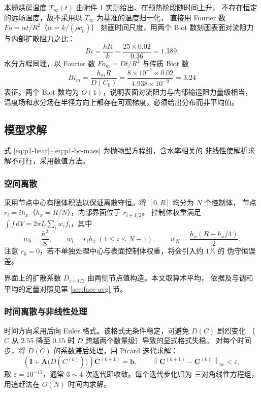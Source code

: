 \documentclass[12pt,a4paper,fontset=none]{ctexart}
\begin{document}
本题烘房温度 $T_\infty(t)$ 由附件 1 实测给出、在预热阶段随时间上升，
不存在恒定的远场温度，故不采用以 $T_\infty$ 为基准的温度归一化，
直接用 Fourier 数 $Fo=\alpha t/R^2$（$\alpha=k/(\rho c_p)$）
刻画时间尺度，用两个 Biot 数刻画表面对流阻力与内部扩散阻力之比：
\begin{equation}
  Bi=\frac{hR}{k}=\frac{25\times0.02}{0.36}=1.389 .
\end{equation}
水分方程同理，以 Fourier 数 $Fo_m=Dt/R^2$ 与传质 Biot 数
\begin{equation}
  Bi_m=\frac{h_mR}{D(C_0)}=\frac{8\times10^{-7}\times0.02}{4.938\times10^{-9}}
  =3.24
\end{equation}
表征。两个 Biot 数均为 $O(1)$，说明表面对流阻力与内部输运阻力量级相当，
温度场和水分场在半径方向上都存在可观梯度，必须给出分布而非平均值。

\subsection{模型求解}
\label{sec:p1-solve}

式 \eqref{eq:p1-heat}--\eqref{eq:p1-bc-mass} 为抛物型方程组，含水率相关的
非线性使解析求解不可行，采用数值方法。

\subsubsection{空间离散}

采用节点中心有限体积法\cite{ref-tao,ref-patankar}以保证离散守恒。将 $[0,R]$ 均分为 $N$ 个控制体，
节点 $r_i=ih_x$（$h_x=R/N$），内部界面位于 $r_{i\pm1/2}$。
控制体权重满足 $\int f\,\mathrm{d}V=2\pi L\sum_i w_i f_i$，其中
\begin{equation}
  w_0=\frac{h_x^2}{8},\qquad
  w_i=r_i h_x\ (1\le i\le N-1),\qquad
  w_N=\frac{h_x(R-h_x/4)}{2}.
  \label{eq:p1-weights}
\end{equation}
注意 $r_0=0$，若不单独处理中心与表面控制体权重，将会引入约 $1\%$ 的
伪守恒误差。

界面上的扩散系数 $D_{i+1/2}$ 由两侧节点值构造。本文取算术平均，
依据及与调和平均的定量对照见第 \ref{sec:face-avg} 节。

\subsubsection{时间离散与非线性处理}

时间方向采用后向 Euler 格式\cite{ref-tao}。该格式无条件稳定，可避免 $D(C)$ 剧烈变化
（$C$ 从 $2.55$ 降至 $0.15$ 时 $D$ 跨越两个数量级）导致的显式格式失稳。
对每个时间步，将 $D(C)$ 的系数滞后处理，用 Picard 迭代求解：
\begin{equation}
  \left(\bm{I}+\bm{A}\big(D(C^{(k)})\big)\right)\bm{C}^{(k+1)}=\bm{b},
  \qquad
  \left\|\bm{C}^{(k+1)}-\bm{C}^{(k)}\right\|_\infty<\varepsilon,
  \label{eq:p1-picard}
\end{equation}
取 $\varepsilon=10^{-13}$，通常 $3\sim4$ 次迭代即收敛。每个迭代步化归为
三对角线性方程组，用追赶法\cite{ref-patankar}在 $O(N)$ 时间内求解。
\end{document}
